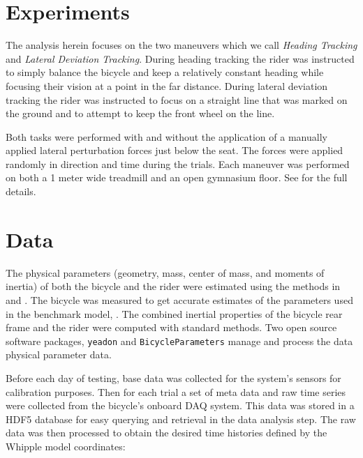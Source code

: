 \documentclass[a4paper]{article}
\begin{document}
\section{Experiments}

The analysis herein focuses on the two maneuvers which we call \emph{Heading
Tracking} and \emph{Lateral Deviation Tracking}. During heading tracking the
rider was instructed to simply balance the bicycle and keep a relatively
constant heading while focusing their vision at a point in the far distance.
During lateral deviation tracking the rider was instructed to focus on a
straight line that was marked on the ground and to attempt to keep the front
wheel on the line.

Both tasks were performed with and without the application of a manually
applied lateral perturbation forces just below the seat. The forces were
applied randomly in direction and time during the trials. Each maneuver was
performed on both a 1 meter wide treadmill and an open gymnasium floor. See
\cite{Moore2012} for the full details.

\section{Data}
\label{sec:data}

The physical parameters (geometry, mass, center of mass, and moments of
inertia) of both the bicycle and the rider were estimated using the methods in
\cite{Moore2012} and \cite{Yeadon1990}. The bicycle was measured to get
accurate estimates of the parameters used in the benchmark model,
\cite{Meijaard2007}. The combined inertial properties of the bicycle rear frame
and the rider were computed with standard methods. Two open source software
packages, \verb|yeadon| \cite{Dembia2011} and \verb|BicycleParameters|
\cite{Moore2011} manage and process the data physical parameter data.



Before each day of testing, base data was collected for the system's sensors
for calibration purposes. Then for each trial a set of meta data and raw time
series were collected from the bicycle's onboard DAQ system. This data was
stored in a HDF5 database for easy querying and retrieval in the data analysis
step. The raw data was then processed to obtain the desired time histories
defined by the Whipple model coordinates:
\end{document}
